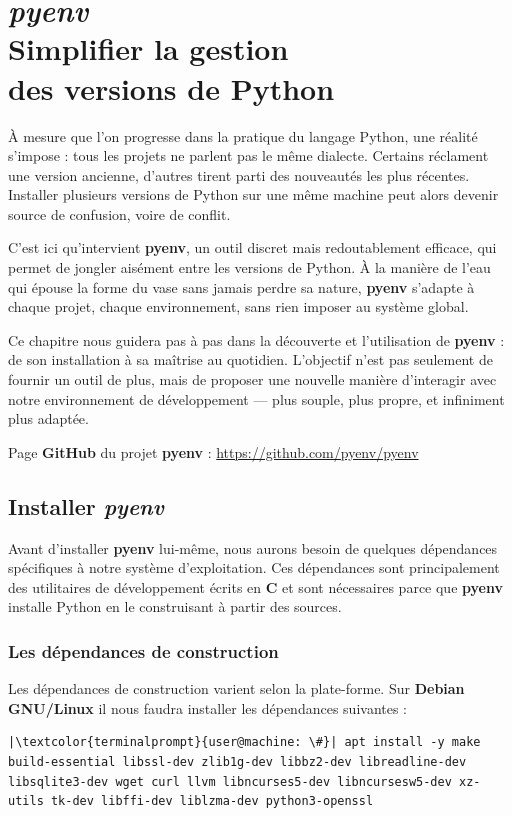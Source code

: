 \chapter[\textit{pyenv}]{\textit{pyenv} \\ Simplifier la gestion \\ des versions de Python}

\bigskip

À mesure que l’on progresse dans la pratique du langage Python, une réalité s’impose : tous les projets ne parlent pas le même dialecte. Certains réclament une version ancienne, d’autres tirent parti des nouveautés les plus récentes. Installer plusieurs versions de Python sur une même machine peut alors devenir source de confusion, voire de conflit.

C’est ici qu’intervient \textbf{pyenv}, un outil discret mais redoutablement efficace, qui permet de jongler aisément entre les versions de Python. À la manière de l’eau qui épouse la forme du vase sans jamais perdre sa nature, \textbf{pyenv} s’adapte à chaque projet, chaque environnement, sans rien imposer au système global.

Ce chapitre nous guidera pas à pas dans la découverte et l’utilisation de \textbf{pyenv} : de son installation à sa maîtrise au quotidien. L’objectif n’est pas seulement de fournir un outil de plus, mais de proposer une nouvelle manière d’interagir avec notre environnement de développement — plus souple, plus propre, et infiniment plus adaptée.

Page \textbf{GitHub} du projet \textbf{pyenv} : \url{https://github.com/pyenv/pyenv}

\section{Installer \textit{pyenv}}
Avant d'installer \textbf{pyenv} lui-même, nous aurons besoin de quelques dépendances spécifiques à notre système d'exploitation. Ces dépendances sont principalement des utilitaires de développement écrits en \textbf{C} et sont nécessaires parce que \textbf{pyenv} installe Python en le construisant à partir des sources.

\subsection*{Les dépendances de construction}
Les dépendances de construction varient selon la plate-forme. Sur \textbf{Debian GNU/Linux} il nous faudra installer les dépendances suivantes :
\begin{lstlisting}[style=terminal]
|\textcolor{terminalprompt}{user@machine: \#}| apt install -y make build-essential libssl-dev zlib1g-dev libbz2-dev libreadline-dev libsqlite3-dev wget curl llvm libncurses5-dev libncursesw5-dev xz-utils tk-dev libffi-dev liblzma-dev python3-openssl
\end{lstlisting}

